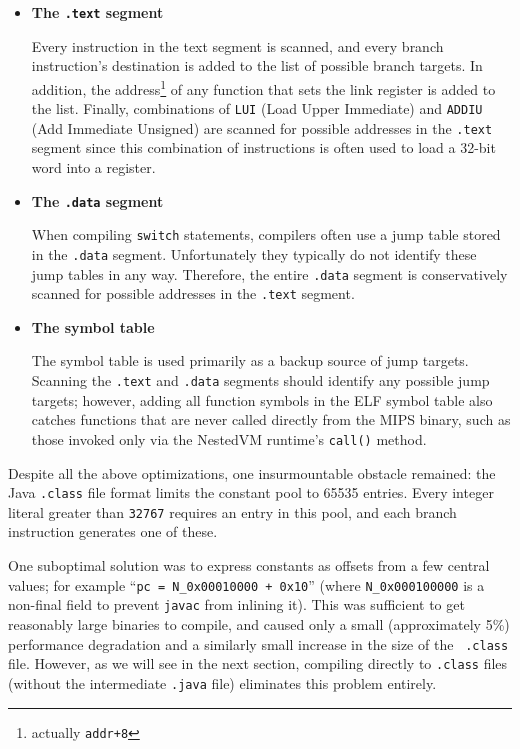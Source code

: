 \documentclass{acmconf}
\begin{document}
\begin{itemize}

\item {\bf The {\tt .text} segment}

      Every instruction in the text segment is scanned, and every
      branch instruction's destination is added to the list of
      possible branch targets.  In addition, the
      address\footnote{actually {\tt addr+8}} of any function that
      sets the link register is added to the list.  Finally,
      combinations of {\tt LUI} (Load Upper Immediate) and {\tt ADDIU}
      (Add Immediate Unsigned) are scanned for possible addresses in
      the {\tt .text} segment since this combination of instructions
      is often used to load a 32-bit word into a register.

\item {\bf The {\tt .data} segment}

      When compiling {\tt switch} statements, compilers often use a
      jump table stored in the {\tt .data} segment.  Unfortunately
      they typically do not identify these jump tables in any way.
      Therefore, the entire {\tt .data} segment is conservatively
      scanned for possible addresses in the {\tt .text} segment.
      
\item {\bf The symbol table}

      The symbol table is used primarily as a backup source of jump
      targets.  Scanning the {\tt .text} and {\tt .data} segments
      should identify any possible jump targets; however, adding all
      function symbols in the ELF symbol table also catches functions
      that are never called directly from the MIPS binary, such as
      those invoked only via the NestedVM runtime's {\tt call()}
      method.

\end{itemize}

Despite all the above optimizations, one insurmountable obstacle
remained: the Java {\tt .class} file format limits the constant pool
to 65535 entries.  Every integer literal greater than {\tt 32767}
requires an entry in this pool, and each branch instruction generates
one of these.

One suboptimal solution was to express constants as offsets from a few
central values; for example ``{\tt pc~=~N\_0x00010000~+~0x10}'' (where
{\tt N\_0x000100000} is a non-final field to prevent {\tt javac} from
inlining it).  This was sufficient to get reasonably large binaries to
compile, and caused only a small (approximately 5\%) performance
degradation and a similarly small increase in the size of the {\tt
.class} file.  However, as we will see in the next section, compiling
directly to {\tt .class} files (without the intermediate {\tt .java}
file) eliminates this problem entirely.
\end{document}
